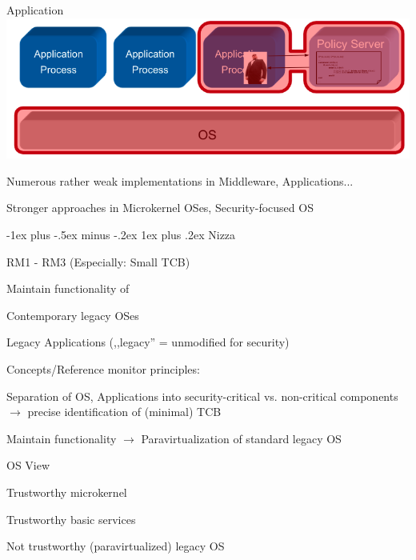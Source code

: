 \documentclass[a4paper]{article}
\makeatletter
\renewcommand{\subsubsection}{\@startsection{subsubsection}{3}{0mm}%
                {-1ex plus -.5ex minus -.2ex}%
                {1ex plus .2ex}%
                {\normalfont\small\bfseries}}
\makeatother
\begin{document}
\begin{multicols}{3}
\begin{multicols}{2}
        Application \includegraphics[width=\linewidth]{Assets/Systemsicherheit-policy-controlled-app-tcp-implementation.png}
    \end{multicols}
    \begin{itemize*}
        \item Numerous rather weak implementations in Middleware, Applications...
        \item Stronger approaches in Microkernel OSes, Security-focused OS
    \end{itemize*}

    \subsubsection{Nizza}
    \begin{itemize*}
        \item RM1 - RM3 (Especially: Small TCB)
        \item Maintain functionality of
        \begin{itemize*}
            \item Contemporary legacy OSes
            \item Legacy Applications (,,legacy'' = unmodified for security)
        \end{itemize*}
    \end{itemize*}

    Concepts/Reference monitor principles:
    \begin{itemize*}
        \item Separation of OS, Applications into security-critical vs. non-critical components $\rightarrow$ precise identification of (minimal) TCB
        \item Maintain functionality $\rightarrow$ Paravirtualization of standard legacy OS
    \end{itemize*}

    OS View
    \begin{itemize*}
        \item Trustworthy microkernel
        \item Trustworthy basic services
        \item Not trustworthy (paravirtualized) legacy OS
    \end{itemize*}


\end{multicols}
\end{document}
